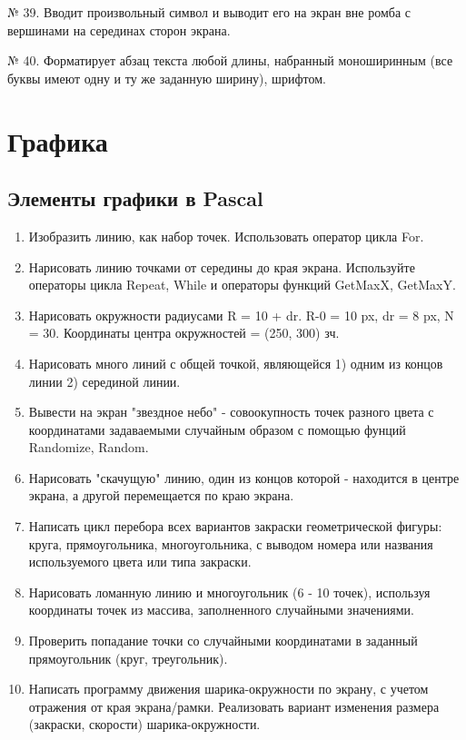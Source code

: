 № 39. Вводит произвольный символ и выводит его на экран вне ромба с вершинами на серединах сторон экрана.

№ 40. Форматирует абзац текста любой длины, набранный моноширинным (все буквы имеют одну и ту же заданную ширину), шрифтом.

\section{Графика}

\subsection{Элементы графики в Pascal}

\begin{enumerate}
  \item Изобразить линию, как набор точек. Использовать оператор цикла For.
  \item Нарисовать линию точками от середины до края экрана. Используйте  операторы цикла Repeat, While и операторы функций GetMaxX, GetMaxY.
  \item Нарисовать окружности радиусами R = 10 + dr. R-0 = 10 px, dr = 8 px, N = 30. Координаты центра окружностей = (250, 300) зч.
  \item Нарисовать много линий с общей точкой, являющейся 1) одним из концов линии 2) серединой линии.
  \item Вывести на экран "звездное небо" - совоокупность точек разного цвета с координатами задаваемыми случайным образом с помощью фунций Randomize, Random.
  \item Нарисовать "скачущую" линию, один из концов которой - находится в центре экрана, а другой перемещается по краю экрана. 
  \item Написать цикл перебора всех вариантов закраски геометрической фигуры: круга, прямоугольника, многоугольника, с выводом номера или названия используемого цвета или типа закраски.
  \item Нарисовать ломанную линию и многоугольник (6 - 10 точек), используя координаты точек  из массива, заполненного случайными значениями. 
  \item Проверить попадание точки со случайными координатами в заданный прямоугольник (круг, треугольник).
  
  \item Написать программу движения шарика-окружности по экрану, с учетом отражения от края экрана/рамки. 
        Реализовать вариант изменения размера (закраски, скорости) шарика-окружности.


\end{enumerate}
